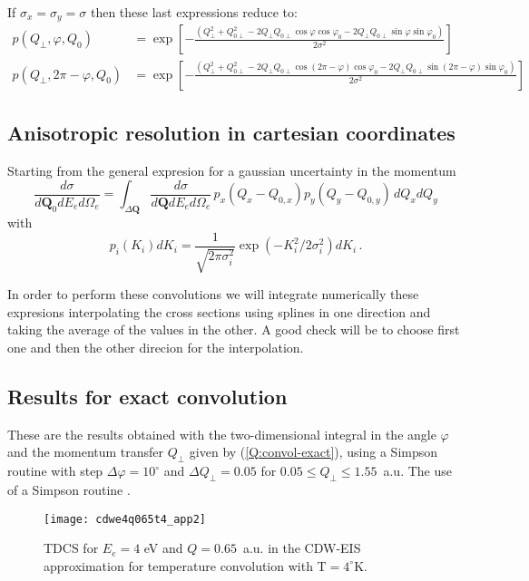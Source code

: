 If $\sigma_{x} = \sigma_{y}=\sigma $ then these last expressions reduce to:
%
\begin{align*}
p(Q_{\perp },\varphi ,Q_{0}) &= \exp{\left[ -\frac{(Q_{\perp }^{2}+Q_{0\perp}^{2}-2Q_{\perp} Q_{0\perp }\cos \varphi \cos \varphi _{0}-2Q_{\perp} Q_{0\perp }\sin \varphi \sin \varphi _{0})}{2\sigma ^{2}}\right]}  \\
p(Q_{\perp },2\pi -\varphi ,Q_{0}) &=\exp \left[ -\frac{(Q_{\perp}^{2}+Q_{0\perp }^{2}-2Q_{\perp }Q_{0\perp }\cos \left( 2\pi -\varphi \right) \cos \varphi _{0}-2Q_{\perp }Q_{0\perp }\sin \left( 2\pi -\varphi \right) \sin \varphi _{0})}{2\sigma ^{2}}\right] 
\end{align*}


\subsection{Anisotropic resolution in cartesian coordinates} 
\label{S:anis-resol-carte-coord}

Starting from the general expresion for a gaussian uncertainty in the momentum
\[
\frac{d \sigma}{d \bm{Q}_{0} d E_{e} d \Omega_{e}} = \int_{\Delta
  \bm{Q}} \frac{d \sigma}{d \bm{Q} d E_{e} d \Omega_{e}}\, p_{x}( Q_{x}- Q_{0,x} ) p_{y}( Q_{y}- Q_{0,y} ) \, d Q_{x} d Q_{y}
\]
with
\[
 p_{i}(K_{i}) dK_{i} = \frac{1}{\sqrt{2 \pi \sigma_{i}^2}} \exp (-K_{i}^{2} / 2\sigma_{i}^{2}) dK_{i} \, .  
\]

In order to perform these convolutions we will integrate numerically these expresions interpolating the cross sections using splines in one direction and taking the average of the values in the other. A good check will be to choose first one and then the other direcion for the interpolation.

\subsection{Results for exact convolution}
\label{S:resul-exact-convol}

These are the results obtained with the two-dimensional integral in the angle $\varphi$ and the momentum transfer $Q_{\perp}$ given by (\ref{Q:convol-exact}), using a Simpson routine with step $\Delta \varphi = 10^{\circ}$ and $\Delta Q_{\perp}=0.05$ for $0.05 \le Q_{\perp} \le 1.55$~a.u.  The use of a Simpson routine . 

\begin{figure}[!htpb]
  \centering
\texttt{[image: cdwe4q065t4\_app2]}
  \caption{TDCS for $E_{e}=4$ eV and $Q=0.65$~a.u. in the CDW-EIS approximation for temperature convolution with T$=4^{\circ}$K.}
  \label{F:cdwe4q065t4_app2}
\end{figure}

